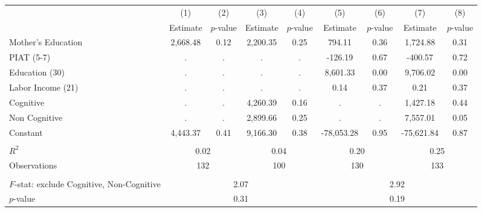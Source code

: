 \begin{tabular}{lcccccccc} \toprule
 & (1) & (2) & (3) & (4) & (5) & (6) & (7) & (8) \\
 & Estimate & $p$-value & Estimate & $p$-value  & Estimate & $p$-value  & Estimate & $p$-value  \\ \midrule 
Mother's Education &     2,668.48 &         0.12 &     2,200.35 &         0.25 &       794.11 &         0.36 &     1,724.88 &         0.31 \\  
PIAT (5-7) &            . &            . &            . &            . &      -126.19 &         0.67 &      -400.57 &         0.72 \\  
Education (30) &            . &            . &            . &            . &     8,601.33 &         0.00 &     9,706.02 &         0.00 \\  
Labor Income (21) &            . &            . &            . &            . &         0.14 &         0.37 &         0.21 &         0.37 \\  
Cognitive &            . &            . &     4,260.39 &         0.16 &            . &            . &     1,427.18 &         0.44 \\  
Non Cognitive &            . &            . &     2,899.66 &         0.25 &            . &            . &     7,557.01 &         0.05 \\  
Constant &     4,443.37 &         0.41 &     9,166.30 &         0.38 &   -78,053.28 &         0.95 &   -75,621.84 &         0.87 \\  \\ \midrule
$R^2$ &         \multicolumn{2}{c}{0.02} &          \multicolumn{2}{c}{0.04} &             \multicolumn{2}{c}{0.20} &                 \multicolumn{2}{c}{0.25}  \\  
Observations &        \multicolumn{2}{c}{132} &        \multicolumn{2}{c}{100} &     \multicolumn{2}{c}{130} &         \multicolumn{2}{c}{133}  \\  \\ \midrule
$F$-stat: exclude Cognitive, Non-Cognitive  &             \multicolumn{4}{c}{2.07} &               \multicolumn{4}{c}{2.92}  \\  
$p$-value &                \multicolumn{4}{c}{0.31} &               \multicolumn{4}{c}{0.19}   \\  \bottomrule \end{tabular}